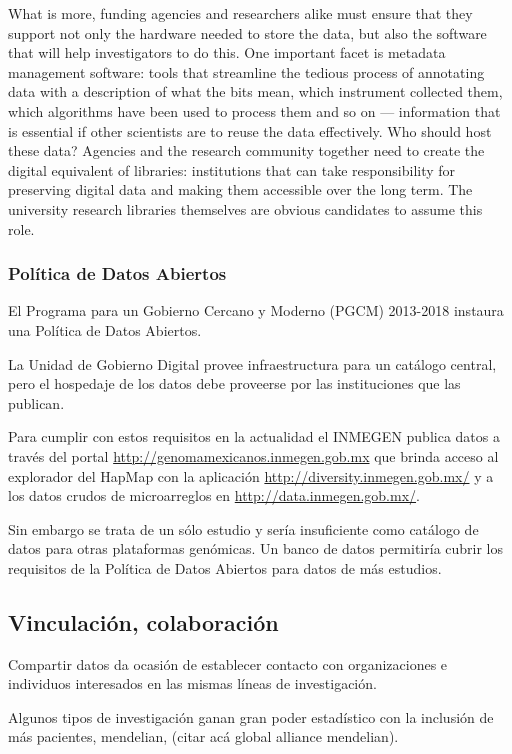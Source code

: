 \documentclass[
10pt, %
letterpaper, %
oneside, %
headinclude,footinclude, %
BCOR5mm, %
]{scrartcl}
\begin{document}
What is more, funding agencies and researchers alike must ensure that
they support not only the hardware needed to store the data, but also
the software that will help investigators to do this. One important
facet is metadata management software: tools that streamline the
tedious process of annotating data with a description of what the bits
mean, which instrument collected them, which algorithms have been used
to process them and so on — information that is essential if other
scientists are to reuse the data effectively. Who should host these
data? Agencies and the research community together need to create the
digital equivalent of libraries: institutions that can take
responsibility for preserving digital data and making them accessible
over the long term. The university research libraries themselves are
obvious candidates to assume this role.

\subsubsection{Política de Datos Abiertos}
El Programa para un Gobierno Cercano y Moderno (PGCM) 2013-2018
instaura una Política de Datos Abiertos.

La Unidad de Gobierno Digital provee infraestructura para un catálogo
central, pero el hospedaje de los datos debe proveerse por las
instituciones que las publican.

Para cumplir con estos requisitos en la actualidad el INMEGEN publica
datos a través del portal \url{http://genomamexicanos.inmegen.gob.mx} que
brinda acceso al explorador del HapMap con la aplicación
\url{http://diversity.inmegen.gob.mx/} y a los datos crudos de microarreglos
en \url{http://data.inmegen.gob.mx/}.

Sin embargo se trata de un sólo estudio y sería insuficiente como
catálogo de datos para otras plataformas genómicas. Un banco de datos
permitiría cubrir los requisitos de la Política de Datos Abiertos para
datos de más estudios.


\subsection{Vinculación, colaboración}
Compartir datos da ocasión de establecer contacto con organizaciones e
individuos interesados en las mismas líneas de investigación.

Algunos tipos de investigación ganan gran poder estadístico con la
inclusión de más pacientes, mendelian, (citar acá global alliance
mendelian). 
\end{document}
